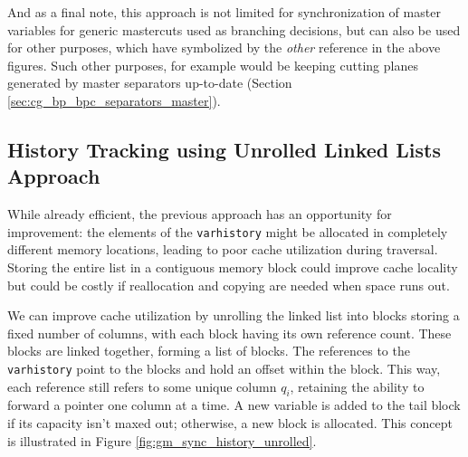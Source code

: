 And as a final note, this approach is not limited for synchronization of master variables for generic mastercuts used as branching decisions, but can also be used for other purposes, which have symbolized by the \textit{other} reference in the above figures. Such other purposes, for example would be keeping cutting planes generated by master separators up-to-date (Section \ref{sec:cg_bp_bpc_separators_master}).

\subsection{History Tracking using Unrolled Linked Lists Approach}\label{subsec:gm_sync_history_unrolled}
While already efficient, the previous approach has an opportunity for improvement: the elements of the \texttt{varhistory} might be allocated in completely different memory locations, leading to poor cache utilization during traversal. Storing the entire list in a contiguous memory block could improve cache locality but could be costly if reallocation and copying are needed when space runs out.

We can improve cache utilization by unrolling the linked list into blocks storing a fixed number of columns, with each block having its own reference count. These blocks are linked together, forming a list of blocks. The references to the \texttt{varhistory} point to the blocks and hold an offset within the block. This way, each reference still refers to some unique column $q_i$, retaining the ability to forward a pointer one column at a time. A new variable is added to the tail block if its capacity isn't maxed out; otherwise, a new block is allocated. This concept is illustrated in Figure \ref{fig:gm_sync_history_unrolled}.

